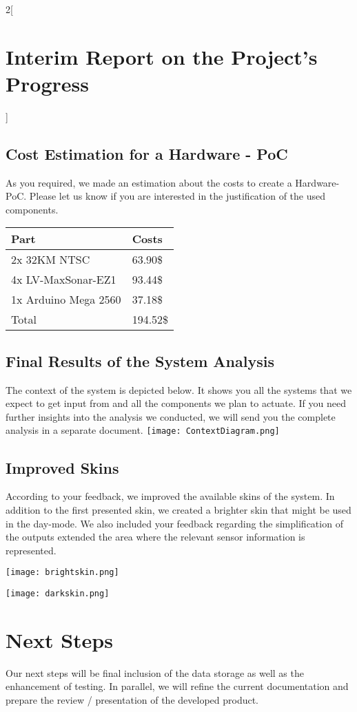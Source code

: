 \documentclass[12pt, a4paper, oneside, british]{report}
\begin{document}
\begin{multicols}{2}[\section{Interim Report on the Project's Progress}]
\subsection{Cost Estimation for a Hardware - PoC}
As you required, we made an estimation about the costs to create a Hardware-PoC. Please let us know if you are interested in the justification of the used components.

\vspace{0.25cm}
{\footnotesize
\renewcommand{\arraystretch}{1.5}
\begin{tabular}{ll}
Part & Costs \\
\hline
2x 32KM NTSC & \hspace{0.07cm} 63.90\$ \\
4x LV-MaxSonar-EZ1  & \hspace{0.07cm} 93.44\$ \\
1x Arduino Mega 2560 & \hspace{0.07cm} 37.18\$ \\ 
\hline
Total & 194.52\$
\end{tabular}}

\subsection{Final Results of the System Analysis}
The context of the system is depicted below. It shows you all the systems that we expect to get input from and all the components we plan to actuate. If you need further insights into the analysis we conducted, we will send you the complete analysis in a separate document.
\texttt{[image: ContextDiagram.png]}

\subsection{Improved Skins}
According to your feedback, we improved the available skins of the system. In addition to the first presented skin, we created a brighter skin that might be used in the day-mode. We also included your feedback regarding the simplification of the outputs extended the area where the relevant sensor information is represented.

\vspace{0.5cm}

\texttt{[image: brightskin.png]}

\vspace{0.5cm}

\texttt{[image: darkskin.png]}

\section{Next Steps}
Our next steps will be final inclusion of the data storage as well as the enhancement of testing. In parallel, we will refine the current documentation and prepare the review / presentation of the developed product.


\end{multicols}
\end{document}
